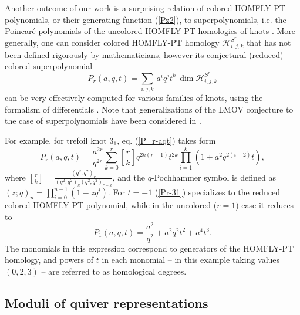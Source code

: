 \documentclass[
 reprint,
 amsmath,amssymb,
 aps,prl
]{revtex4-1}
\newcommand{\be}{\begin{equation}}
\newcommand{\ee}{\end{equation}}
\begin{document}
Another outcome of our work is a surprising relation of colored HOMFLY-PT polynomials, or their generating function (\ref{Pz2}), to superpolynomials, i.e. the Poincar\'{e} polynomials of the uncolored HOMFLY-PT homologies of knots \cite{DGR}. More generally, one can consider colored HOMFLY-PT homology $\mathcal{H}^{S^r}_{i,j,k}$ that has not been defined rigorously by mathematicians, however its conjectural (reduced) colored superpolynomial
\be
P_r (a,q,t) = \sum_{i,j,k} \, a^i q^j t^k \, \dim \mathcal{H}^{S^r}_{i,j,k}   \label{P_r-aqt}
\ee
can be very effectively computed for various families of knots, using the formalism of differentials \cite{DGR,Rasmussen-differentials,Gukov:2011ry,Gukov:2015gmm}. 
Note that generalizations of the LMOV conjecture to the case of superpolynomials have been considered in \cite{Garoufalidis:2015ewa,Kameyama:2017ryw}.

For example, for trefoil knot $3_1$, eq. (\ref{P_r-aqt}) takes form \cite{FGSS}
\be
P_r(a,q,t)=  \frac{a^{2r}}{q^{2r}}\sum_{k=0}^r {r \brack k} q^{2k(r+1)} t^{2k} \prod_{i=1}^k  (1+a^2q^{2(i-2)}t), \label{Pr-31}
\ee
where ${r \brack k} = \frac{(q^2;q^2)_r}{(q^2;q^2)_k(q^2;q^2)_{r-k}}$, and the $q$-Pochhammer symbol is defined as $(z;q)_n=\prod_{i=0}^{n-1} (1-zq^i)$. For $t=-1$ (\ref{Pr-31}) specializes to the reduced colored HOMFLY-PT polynomial, while in the uncolored ($r=1$) case it reduces to
\be
P_1(a,q,t) = \frac{a^2}{q^2} + a^2 q^2 t^2 + a^4 t^3.   \label{P1-31}
\ee
The monomials in this expression correspond to generators of the HOMFLY-PT homology, and powers of $t$ in each monomial -- in this example taking values $(0,2,3)$ -- are referred to as homological degrees.











\subsection{Moduli of quiver representations}
\end{document}
